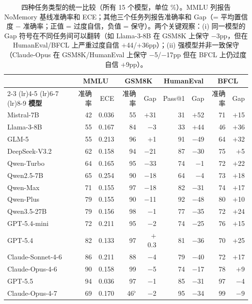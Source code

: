\documentclass[11pt,a4paper,fontset=fandol]{ctexart}
\begin{document}
\begin{table}[h]
\centering
\small
\setlength{\tabcolsep}{4pt}
\begin{tabular}{l rr rr rr rr}
\toprule
& \multicolumn{2}{c}{\textbf{MMLU}} & \multicolumn{2}{c}{\textbf{GSM8K}} & \multicolumn{2}{c}{\textbf{HumanEval}} & \multicolumn{2}{c}{\textbf{BFCL}} \\
\cmidrule(lr){2-3} \cmidrule(lr){4-5} \cmidrule(lr){6-7} \cmidrule(lr){8-9}
\textbf{模型} & 准确率 & ECE & 准确率 & Gap & Pass@1 & Gap & 准确率 & Gap \\
\midrule
Mistral-7B        & 42 & 0.036 & 55 & $+$31 & 31 & $+$52 & 71 & $+$15 \\
Llama-3-8B        & 55 & 0.167 & 84 & $-$3  & 33 & $+$44 & 46 & $+$36 \\
GLM-5             & 55 & 0.213 & 96 & $+$1  & 91 & $-$49 & 64 & $+$32 \\
DeepSeek-V3.2     & 62 & 0.158 & 94 & $-$21 & 87 & $-$30 & 75 & $+$5  \\
Qwen-Turbo        & 64 & 0.165 & 95 & $-$33 & 74 & $-$1  & 72 & $+$22 \\
Qwen2.5-7B        & 65 & 0.254 & 90 & $-$18 & 64 & $-$4  & 73 & $+$18 \\
Qwen-Max          & 71 & 0.155 & 97 & $-$18 & 82 & $-$31 & 74 & $+$17 \\
Qwen-Plus         & 79 & 0.155 & 90 & $-$11 & 92 & $-$48 & 80 & $+$10 \\
Qwen3.5-27B       & 79 & 0.156 & 98 & $-$1  & 77 & $-$35 & 72 & $+$24 \\
\midrule
GPT-5.4-mini      & 72 & 0.211 & 95 & $-$2  & 74 & $-$25 & 76 & $+$15 \\
GPT-5.4           & 82 & 0.133 & 97 & $+$0.3 & 81 & $-$36 & 70 & $+$25 \\
Claude-Sonnet-4-6 & 86 & 0.211 & 88 & $-$4  & 79 & $-$40 & 72 & $+$17 \\
Claude-Opus-4-6   & 90 & 0.158 & 99 & $-$5  & 74 & $-$17 & 78 & $+$9  \\
GPT-5.5           & 94 & 0.036 & 97 & $-$1  & 85 & $-$31 & 97 & $-$4  \\
Claude-Opus-4-7   & 69 & 0.170 & 46$^\flat$ & $-$2 & 95 & $-$34 & 99 & $-$9  \\
\bottomrule
\end{tabular}
\caption{四种任务类型的统一比较（所有 15 个模型，单位 \%）。MMLU 列报告 NoMemory 基线准确率和 ECE；其他三个任务列报告准确率和 Gap（= 平均置信度 $-$ 准确率；正值 = 过度自信，负值 = 保守）。两个关键观察：(i) 同一模型的 Gap 符号在不同任务间可以翻转（如 Llama-3-8B 在 GSM8K 上保守 $-$3pp，但在 HumanEval/BFCL 上严重过度自信 $+$44/$+$36pp）；(ii) 强模型并非一致保守（Claude-Opus 在 GSM8K/HumanEval 上保守 $-$5/$-$17pp 但在 BFCL 上仍过度自信 $+$9pp）。}
\label{tab:fourtask_overview}
\end{table}
\end{document}
